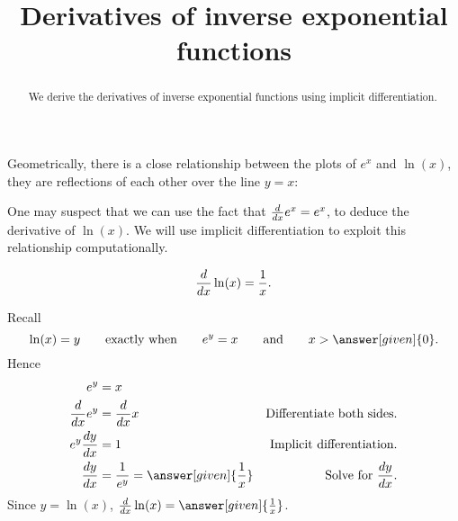 \documentclass{ximera}
\title[Dig-In:]{Derivatives of inverse exponential functions}
\begin{document}
\begin{abstract}
  We derive the derivatives of inverse exponential functions using
  implicit differentiation.
\end{abstract}
\maketitle


Geometrically, there is a close relationship between the plots of
$e^x$ and $\ln(x)$, they are reflections of each other over the line
$y=x$:
\begin{image}
\end{image}
One may suspect that we can use the fact that $\frac{d}{\mathop{}\!d x} e^x = e^x$, to
deduce the derivative of $\ln(x)$.  We will use implicit
differentiation to exploit this relationship computationally.

\begin{theorem}
\[
\frac{d}{\mathop{}\!d x} \ln(x) = \frac{1}{x}.
\]
\begin{explanation}
  Recall
\[
\ln(x) = y \qquad\text{exactly when}\qquad e^y = x\qquad\text{and}\qquad x>\answer[given]{0}.
\]
Hence
\begin{align*}
e^y &= x\\
\ddx e^y &= \ddx x &\text{Differentiate both sides.}\\
e^y \dd[y]{x} &= 1 &\text{Implicit differentiation.}\\
\dd[y]{x} &= \frac{1}{e^y} = \answer[given]{\frac{1}{x}}&\text{Solve for $\dd[y]{x}$.}
\end{align*}
Since $y=\ln(x)$, $\ddx \ln(x) = \answer[given]{\frac{1}{x}}$.
\end{explanation}
\end{theorem}
\end{document}

